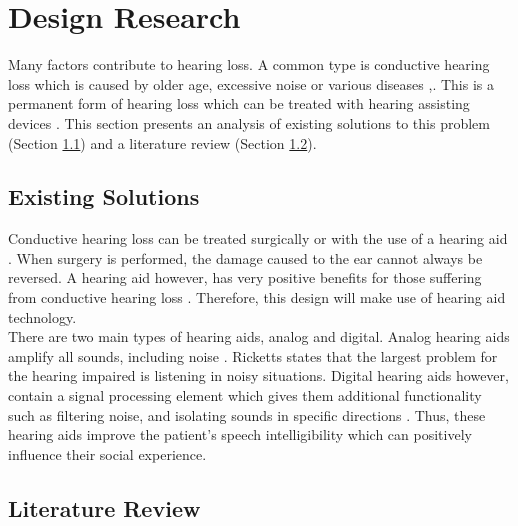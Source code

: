 \documentclass[11pt,onecolumn]{witseiepaper}
\begin{document}
\section{Design Research}

\noindent Many factors contribute to hearing loss. A common type is conductive hearing loss which is caused by older age, excessive noise or various diseases \cite{earinfo},\cite{hearIt}. This is a permanent form of hearing loss which can be treated with hearing assisting devices \cite{hearIt}. This section presents an analysis of existing solutions to this problem (Section \ref{sec:existSoln}) and a literature review (Section \ref{sec:litReview}).

\subsection{Existing Solutions}
\label{sec:existSoln}


\noindent Conductive hearing loss can be treated surgically or with the use of a hearing aid  \cite{condLoss}. When surgery is performed, the damage caused to the ear cannot always be reversed. A hearing aid however, has very positive benefits for those suffering from conductive hearing loss \cite{condLoss}. Therefore, this design will make use of hearing aid technology.\\
\newline
\noindent There are two main types of hearing aids, analog and digital. Analog hearing aids amplify all sounds, including noise \cite{woodford}. Ricketts \cite{ricketts} states that the largest problem for the hearing impaired is listening in noisy situations. Digital hearing aids however, contain a signal processing element which gives them additional functionality such as filtering noise, and isolating sounds in specific directions \cite{ricketts}. Thus, these hearing aids improve the patient's speech intelligibility which can positively influence their social experience.

\subsection{Literature Review}
\label{sec:litReview}
\end{document}
